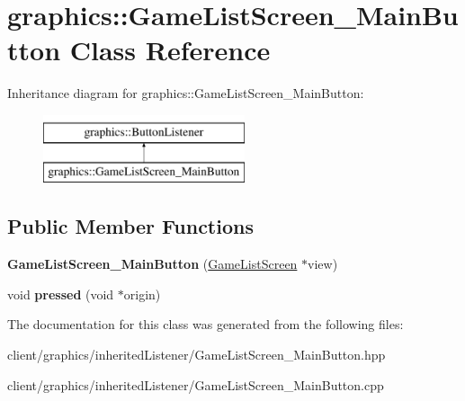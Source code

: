 \hypertarget{classgraphics_1_1_game_list_screen___main_button}{\section{graphics\-:\-:Game\-List\-Screen\-\_\-\-Main\-Button Class Reference}
\label{classgraphics_1_1_game_list_screen___main_button}
}
Inheritance diagram for graphics\-:\-:Game\-List\-Screen\-\_\-\-Main\-Button\-:\begin{figure}[H]
\begin{center}
\leavevmode
\includegraphics[height=2.000000cm]{classgraphics_1_1_game_list_screen___main_button}
\end{center}
\end{figure}
\subsection*{Public Member Functions}
\begin{DoxyCompactItemize}
\item 
\hypertarget{classgraphics_1_1_game_list_screen___main_button_a152d6b4490e7dabae661e6c008eec2ad}{{\bfseries Game\-List\-Screen\-\_\-\-Main\-Button} (\hyperlink{classgraphics_1_1_game_list_screen}{Game\-List\-Screen} $\ast$view)}\label{classgraphics_1_1_game_list_screen___main_button_a152d6b4490e7dabae661e6c008eec2ad}

\item 
\hypertarget{classgraphics_1_1_game_list_screen___main_button_aa243a44e6873baa6be66f1b3c73c545d}{void {\bfseries pressed} (void $\ast$origin)}\label{classgraphics_1_1_game_list_screen___main_button_aa243a44e6873baa6be66f1b3c73c545d}

\end{DoxyCompactItemize}


The documentation for this class was generated from the following files\-:\begin{DoxyCompactItemize}
\item 
client/graphics/inherited\-Listener/Game\-List\-Screen\-\_\-\-Main\-Button.\-hpp\item 
client/graphics/inherited\-Listener/Game\-List\-Screen\-\_\-\-Main\-Button.\-cpp\end{DoxyCompactItemize}
